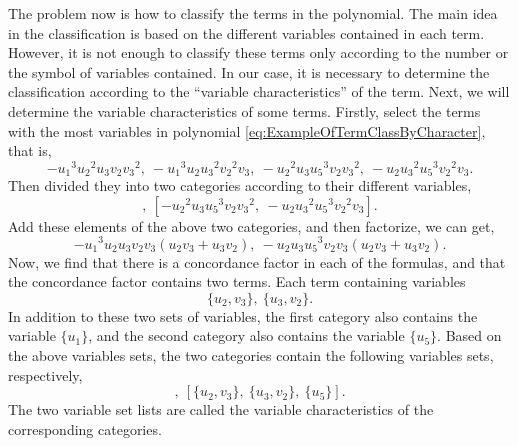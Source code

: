 \documentclass[10pt,a4paper]{article}
\begin{document}
The problem now is how to classify the terms in the polynomial. The main idea in the classification is based on the different variables contained in each term. However, it is not enough to classify these terms only according to the number or the symbol of variables contained. In our case, it is necessary to determine the classification according to the ``variable characteristics'' of the term. Next, we will determine the variable characteristics of some terms. Firstly, select the terms with the most variables in polynomial \eqref{eq:ExampleOfTermClassByCharacter}, that is,
\begin{equation*}
  - {u_{{1}}}^{3}{u_{{2}}}^{2}u_{{3}}v_{{2}}{v_{{3}}}^{2},\ - {u_{{1}}}^{3}u_{{2}}{u_{{3}}}^{2}{v_{{2}}}^{2}v_{{3}},\ - {u_{{2}}}^{2}u_{{3}}{u_{{5}}}^{3}v_{{2}}{v_{{3}}}^{2},\ - u_{{2}}{u_{{3}}}^{2}{u_{{5}}}^{3}{v_{{2}}}^{2}v_{{3}}.
\end{equation*}
Then divided they into two categories according to their different variables,
\begin{equation*}
  [- {u_{{1}}}^{3}{u_{{2}}}^{2}u_{{3}}v_{{2}}{v_{{3}}}^{2},\ - {u_{{1}}}^{3}u_{{2}}{u_{{3}}}^{2}{v_{{2}}}^{2}v_{{3}}],\ [- {u_{{2}}}^{2}u_{{3}}{u_{{5}}}^{3}v_{{2}}{v_{{3}}}^{2},\ - u_{{2}}{u_{{3}}}^{2}{u_{{5}}}^{3}{v_{{2}}}^{2}v_{{3}}].
\end{equation*}
Add these elements of the above two categories, and then factorize, we can get,
\begin{equation*}
  -{u_{{1}}}^{3}u_{{2}}u_{{3}}v_{{2}}v_{{3}} \left( u_{{2}}v_{{3}}+u_{{3}}v_{{2}} \right),\ -u_{{2}}u_{{3}}{u_{{5}}}^{3}v_{{2}}v_{{3}} \left( u_{{2}}v_{{3}}+u_{{3}}v_{{2}} \right).
\end{equation*}
Now, we find that there is a concordance factor in each of the formulas, and that the concordance factor contains two terms. Each term containing variables
\begin{equation*}
  \{u_2, v_3\},\ \{u_3, v_2\}.
\end{equation*}
In addition to these two sets of variables, the first category also contains the variable $\{u_1\}$, and the second category also contains the variable $\{u_5\}$. Based on the above variables sets, the two categories contain the following variables sets, respectively,
\begin{equation*}
  [\{u_2, v_3\},\ \{u_3, v_2\},\ \{u_1\}],\ [\{u_2, v_3\},\ \{u_3, v_2\},\ \{u_5\}].
\end{equation*}
The two variable set lists are called the variable characteristics of the corresponding categories.
\end{document}
